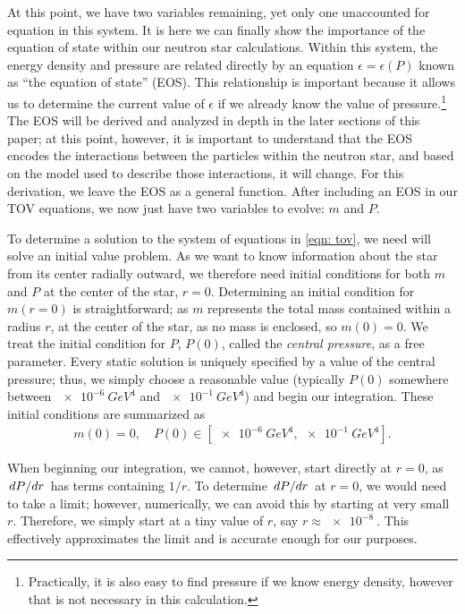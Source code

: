 At this point, we have two variables remaining, yet only one unaccounted for equation in this system. It is here we can finally show the importance of the equation of state within our neutron star calculations. Within this system, the energy density and pressure are related directly by an equation $\epsilon = \epsilon(P)$ known as ``the equation of state'' (EOS). This relationship is important because it allows us to determine the current value of $\epsilon$ if we already know the value of pressure.\footnote{ Practically, it is also easy to find pressure if we know energy density, however that is not necessary in this calculation.} The EOS will be derived and analyzed in depth in the later sections of this paper; at this point, however, it is important to understand that the EOS encodes the interactions between the particles within the neutron star, and based on the model used to describe those interactions, it will change. For this derivation, we leave the EOS as a general function. After including an EOS in our TOV equations, we now just have two variables to evolve: $m$ and $P$.

To determine a solution to the system of equations in \eqref{eqn: tov}, we need will solve an initial value problem. As we want to know information about the star from its center radially outward, we therefore need initial conditions for both $m$ and $P$ at the center of the star, $r=0$. Determining an initial condition for $m(r=0)$ is straightforward; as $m$ represents the total mass contained within a radius $r$, at the center of the star, as no mass is enclosed, so $m(0)=0$. We treat the initial condition for $P$, $P(0)$, called the \textit{central pressure}, as a free parameter. Every static solution is uniquely specified by a value of the central pressure; thus, we simply choose a reasonable value (typically $P(0)$ somewhere between $\SI{e-6}{GeV^4}$ and $\SI{e-1}{GeV^4}$) and begin our integration. These initial conditions are summarized as
\begin{align}\label{eqn: tov ic}
    m(0) = 0, \quad P(0) \in [\SI{e-6}{GeV^4}, \SI{e-1}{GeV^4}].
\end{align}

When beginning our integration, we cannot, however, start directly at $r=0$, as $\dv*{P}{r}$ has terms containing $1/r$. To determine $\dv*{P}{r}$ at $r=0$, we would need to take a limit; however, numerically, we can avoid this by starting at very small $r$. Therefore, we simply start at a tiny value of $r$, say $r\approx\SI{e-8}{}$. This effectively approximates the limit and is accurate enough for our purposes.

